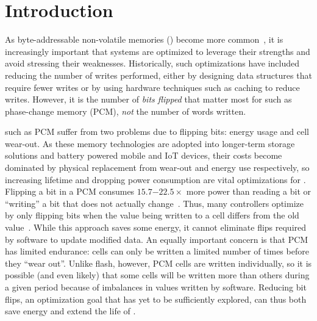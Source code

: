 
\section{Introduction}

As byte-addressable non-volatile memories (\NVMs) become more
common~\cite{lee_architecting_2009,fox:2001feram,intel3dxpoint}, it is
increasingly important that systems are optimized to leverage their
strengths and avoid stressing their weaknesses.  Historically, such
optimizations have included reducing the number of writes performed, either by
designing data structures that require fewer writes or by using hardware
techniques such as caching to reduce writes. However, it is the number of \emph{bits flipped} that
matter most for \NVMs such as phase-change memory (PCM), \emph{not} the number of words written.


\NVMs such as PCM suffer from two problems due to flipping bits: energy usage
and cell wear-out.
As these memory technologies are adopted into longer-term storage solutions and
battery powered mobile and IoT devices, their costs become dominated by physical
replacement from wear-out and energy use respectively, so increasing lifetime
and dropping power consumption are vital optimizations for \NVM.
Flipping a bit in a PCM consumes
$15.7\mathit{-}22.5\times$ more power than reading a bit or ``writing''
a bit that does not actually
change~\cite{dhiman_pdram:_2009,lee_architecting_2009,xiangyu_dong_nvsim:_2012,qureshi_scalable_2009}.
Thus, many controllers optimize by only flipping bits when the value being
written to a cell differs from the old value~\cite{yang:iscas07}.  While this
approach saves some energy, it cannot eliminate flips required by software to
update modified data. An equally important concern is that PCM has
limited endurance: cells can only be written a limited number of times before
they ``wear out''. Unlike flash, however, PCM cells are written individually, so
it is possible (and even likely) that some cells will be written more than
others during a given period because of imbalances in values written by
software. Reducing bit flips, an optimization goal that has yet to be
sufficiently explored, can thus both save energy and extend the life of \NVM.

%


